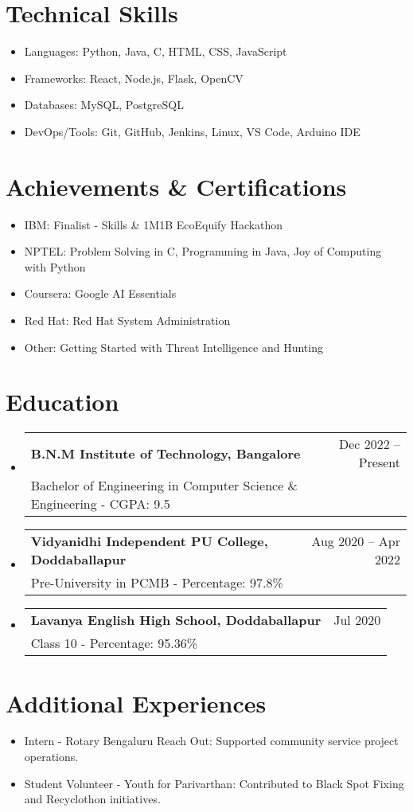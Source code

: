 \documentclass[a4paper,10pt]{article}
\makeatletter
\newcommand{\resumeItem}[1]{\item\small{#1}}
\newcommand{\resumeEduheading}[4]{
  \vspace{2pt}\item
    \begin{tabular*}{0.97\textwidth}{l@{\extracolsep{\fill}}r}
      \textbf{#1} & #2 \\
      {#3} & {#4} \\
    \end{tabular*}\vspace{-5pt}
}
\newcommand{\resumeSubHeadingListStart}{\begin{itemize}[leftmargin=*]}
\newcommand{\resumeSubHeadingListEnd}{\end{itemize}}
\makeatother
\begin{document}
\section{Technical Skills}
  \resumeSubHeadingListStart
    \resumeItem{Languages: Python, Java, C, HTML, CSS, JavaScript}
    \resumeItem{Frameworks: React, Node.js, Flask, OpenCV}
    \resumeItem{Databases: MySQL, PostgreSQL}
    \resumeItem{DevOps/Tools: Git, GitHub, Jenkins, Linux, VS Code, Arduino IDE}
  \resumeSubHeadingListEnd

\section{Achievements \& Certifications}
  \resumeSubHeadingListStart
    \resumeItem{IBM: Finalist - Skills \& 1M1B EcoEquify Hackathon}
    \resumeItem{NPTEL: Problem Solving in C, Programming in Java, Joy of Computing with Python}
    \resumeItem{Coursera: Google AI Essentials}
    \resumeItem{Red Hat: Red Hat System Administration}
    \resumeItem{Other: Getting Started with Threat Intelligence and Hunting}
  \resumeSubHeadingListEnd

\section{Education}
  \resumeSubHeadingListStart
    \resumeEduheading
      {B.N.M Institute of Technology, Bangalore}{Dec 2022 -- Present}
      {Bachelor of Engineering in Computer Science \& Engineering - CGPA: 9.5}{}

    \resumeEduheading
      {Vidyanidhi Independent PU College, Doddaballapur}{Aug 2020 -- Apr 2022}
      {Pre-University in PCMB - Percentage: 97.8\%}{}

    \resumeEduheading
      {Lavanya English High School, Doddaballapur}{Jul 2020}
      {Class 10 - Percentage: 95.36\%}{}
  \resumeSubHeadingListEnd

\section{Additional Experiences}
  \resumeSubHeadingListStart
    \resumeItem{Intern - Rotary Bengaluru Reach Out: Supported community service project operations.}
    \resumeItem{Student Volunteer - Youth for Parivarthan: Contributed to Black Spot Fixing and Recyclothon initiatives.}
  \resumeSubHeadingListEnd
\end{document}
